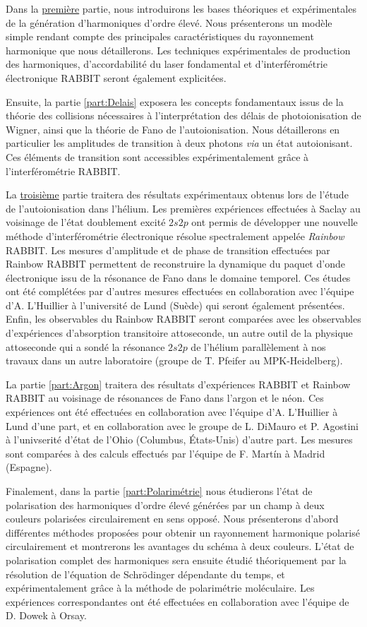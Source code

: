 Dans la \hyperref[part:GHOE]{première} partie, nous introduirons les bases théoriques et expérimentales de la génération d'harmoniques d'ordre élevé. Nous présenterons un modèle simple rendant compte des principales caractéristiques du rayonnement harmonique que nous détaillerons. Les techniques expérimentales de production des harmoniques, d'accordabilité du laser fondamental et d'interférométrie électronique RABBIT seront également explicitées.

Ensuite, la partie \ref{part:Delais} exposera les concepts fondamentaux issus de la théorie des collisions nécessaires à l'interprétation des délais de photoionisation de Wigner, ainsi que la théorie de Fano de l'autoionisation. Nous détaillerons en particulier les amplitudes de transition à deux photons \textit{via} un état autoionisant. Ces éléments de transition sont accessibles expérimentalement grâce à l'interférométrie RABBIT.

La \hyperref[part:Helium]{troisième} partie traitera des résultats expérimentaux obtenus lors de l'étude de l'autoionisation dans l'hélium. Les premières expériences effectuées à Saclay au voisinage de l'état doublement excité $2s2p$ ont permis de développer une nouvelle méthode d'interférométrie électronique résolue spectralement appelée \textit{Rainbow} RABBIT. Les mesures d'amplitude et de phase de transition effectuées par Rainbow RABBIT permettent de reconstruire la dynamique du paquet d'onde électronique issu de la résonance de Fano dans le domaine temporel. Ces études ont été complétées par d'autres mesures effectuées en collaboration avec l'équipe d'A. L'Huillier à l'université de Lund (Suède) qui seront également présentées. Enfin, les observables du Rainbow RABBIT seront comparées avec les observables d'expériences d'absorption transitoire attoseconde, un autre outil de la physique attoseconde qui a sondé la résonance $2s2p$ de l'hélium parallèlement à nos travaux dans un autre laboratoire (groupe de T. Pfeifer au MPK-Heidelberg).

La partie \ref{part:Argon} traitera des résultats d'expériences RABBIT et Rainbow RABBIT au voisinage de résonances de Fano dans l'argon et le néon. Ces expériences ont été effectuées en collaboration avec l'équipe d'A. L'Huillier à Lund d'une part, et en collaboration avec le groupe de L. DiMauro et P. Agostini à l'univserité d'état de l'Ohio (Columbus, \'{E}tats-Unis) d'autre part. Les mesures sont comparées à des calculs effectués par l'équipe de F. Mart\'{i}n à Madrid (Espagne).

Finalement, dans la partie \ref{part:Polarimétrie} nous étudierons l'état de polarisation des harmoniques d'ordre élevé générées par un champ à deux couleurs polarisées circulairement en sens opposé. Nous présenterons d'abord différentes méthodes proposées pour obtenir un rayonnement harmonique polarisé circulairement et montrerons les avantages du schéma à deux couleurs. L'état de polarisation complet des harmoniques sera ensuite étudié théoriquement par la résolution de l'équation de Schrödinger dépendante du temps, et expérimentalement grâce à la méthode de polarimétrie moléculaire. Les expériences correspondantes ont été effectuées en collaboration avec l'équipe de D. Dowek à Orsay.


